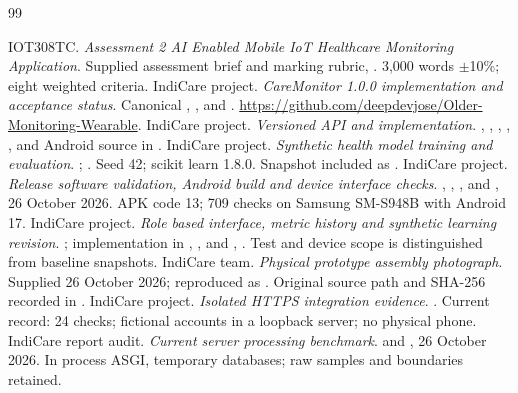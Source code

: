 \begin{thebibliography}{99}
\fontsize{8.5}{10}\selectfont
\setlength{\itemsep}{1pt}
\setlength{\parskip}{0pt}
 IOT308TC. \emph{Assessment 2 AI Enabled Mobile IoT Healthcare Monitoring Application}. Supplied assessment brief and marking rubric, . 3,000 words $\pm$10\%; eight weighted criteria.
 IndiCare project. \emph{CareMonitor 1.0.0 implementation and acceptance status}. Canonical , ,  and . \url{https://github.com/deepdevjose/Older-Monitoring-Wearable}.
 IndiCare project. \emph{Versioned API and implementation}. , , , , ,  and Android source in .
 IndiCare project. \emph{Synthetic health model training and evaluation}. ; . Seed 42; scikit learn 1.8.0. Snapshot included as .
 IndiCare project. \emph{Release software validation, Android build and device interface checks}. , , ,  and , 26 October 2026. APK code 13; 709 checks on Samsung SM-S948B with Android 17.
 IndiCare project. \emph{Role based interface, metric history and synthetic learning revision}. ; implementation in , ,  and , \CurrentRevisionDate. Test and device scope is distinguished from baseline snapshots.
 IndiCare team. \emph{Physical prototype assembly photograph}. Supplied 26 October 2026; reproduced as . Original source path and SHA-256 recorded in .
 IndiCare project. \emph{Isolated HTTPS integration evidence}. . Current record: 24 checks; fictional accounts in a loopback server; no physical phone.
 IndiCare report audit. \emph{Current server processing benchmark}.  and , 26 October 2026. In process ASGI, temporary databases; raw samples and boundaries retained.

\end{thebibliography}
